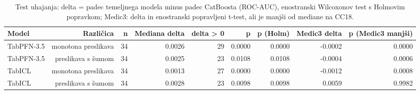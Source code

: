 \begin{table}[htbp]
\centering
\caption{Test uhajanja: delta = padec temeljnega modela minus padec CatBoosta (ROC-AUC), enostranski Wilcoxonov test s Holmovim popravkom; Medic3: delta in enostranski popravljeni t-test, ali je manjši od mediane na CC18.}
\label{tab:uhajanje}
\begin{tabular}{lrrrrrrrr}
\hline
Model & Različica & n & Mediana delta & delta > 0 & p & p (Holm) & Medic3 delta & p (Medic3 manjši) \\
\hline
TabPFN-3.5 & monotona preslikava & 34 & 0.0026 & 29 & 0.0000 & 0.0000 & -0.0002 & 0.0000 \\
TabPFN-3.5 & preslikava s šumom & 34 & 0.0025 & 23 & 0.0108 & 0.0108 & -0.0004 & 0.0006 \\
TabICL & monotona preslikava & 34 & 0.0013 & 27 & 0.0000 & 0.0000 & -0.0012 & 0.0008 \\
TabICL & preslikava s šumom & 34 & 0.0028 & 23 & 0.0098 & 0.0098 & 0.0059 & 0.9982 \\
\hline
\end{tabular}
\end{table}
